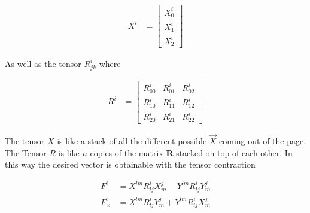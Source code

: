 \documentclass[paper=a4, fontsize=11pt]{scrartcl} %
\numberwithin{equation}{section} %
\numberwithin{figure}{section} %
\numberwithin{table}{section} %
\begin{document}
\begin{align}
X^i &= 
\begin{bmatrix}
X^{i}_0 \\
X^{i}_1 \\
X^{i}_2
\end{bmatrix}
\end{align}

As well as the tensor $R^{i}_{jk}$ where

\begin{align}
R^{i} &= 
\begin{bmatrix}
R^{i}_{00} & R^{i}_{01} & R^{i}_{02} \\ 
R^{i}_{10} & R^{i}_{11} & R^{i}_{12} \\ 
R^{i}_{20} & R^{i}_{21} & R^{i}_{22}  
\end{bmatrix}
\end{align} 

The tensor $X$ is like a stack of all the different possible $\vec{X}$ coming out of the page. The Tensor $R$ is like $n$ copies of the matrix $\mathbf{R}$ stacked on top of each other. In this way the desired vector is obtainable with the tensor contraction 

\begin{align}
F^{i}_{+} &= X^{lm}R^{i}_{lj}X^{j}_{m} - Y^{lm}R^{i}_{lj}Y^{j}_{m} \\ 
F^{i}_{\times} &= X^{lm}R^{i}_{lj}Y^{j}_{m} + Y^{lm}R^{i}_{lj}X^{j}_{m} \\ 
\end{align}
\end{document}
